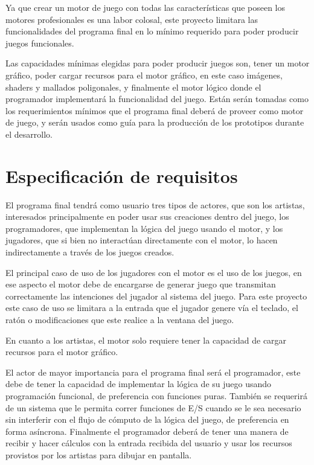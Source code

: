 Ya que crear un motor de juego con todas las características que poseen los motores profesionales es una labor colosal, este proyecto limitara las funcionalidades del programa final en lo mínimo requerido para poder producir juegos funcionales.

Las capacidades mínimas elegidas para poder producir juegos son, tener un  motor gráfico, poder cargar recursos para el motor gráfico, en este caso imágenes, shaders y mallados poligonales, y finalmente el motor lógico donde el programador implementará la funcionalidad del juego. Están serán tomadas como los requerimientos  mínimos que el programa final deberá de proveer como motor de juego, y serán usados como guía para la producción de los prototipos durante el desarrollo.

\section{Especificación de requisitos}

El programa final tendrá como usuario tres tipos de actores, que son los artistas, interesados principalmente en poder usar sus creaciones dentro del juego, los programadores, que implementan la lógica del juego usando el motor, y los jugadores, que si bien no interactúan directamente con el motor, lo hacen indirectamente a través de los juegos creados.

El principal caso de uso de los jugadores con el motor es el uso de los juegos, en ese aspecto el motor debe de encargarse de generar juego que transmitan correctamente las intenciones del jugador al sistema del juego. Para este proyecto este caso de uso se limitara a la entrada que el jugador genere vía el teclado, el ratón o modificaciones que este realice a la ventana del juego.

En cuanto a los artistas, el motor solo requiere tener la capacidad de cargar recursos para el motor gráfico.

El actor de mayor importancia para el programa final será el programador, este debe de tener la capacidad de implementar la lógica de su juego usando programación funcional, de preferencia con funciones puras. También se requerirá de un sistema que le permita correr funciones de E/S cuando se le sea necesario sin interferir con el flujo de cómputo de la lógica del juego, de preferencia en forma asíncrona. Finalmente el programador deberá de tener una manera de recibir y hacer cálculos con la entrada recibida del usuario y usar los recursos provistos por los artistas para dibujar en pantalla.

